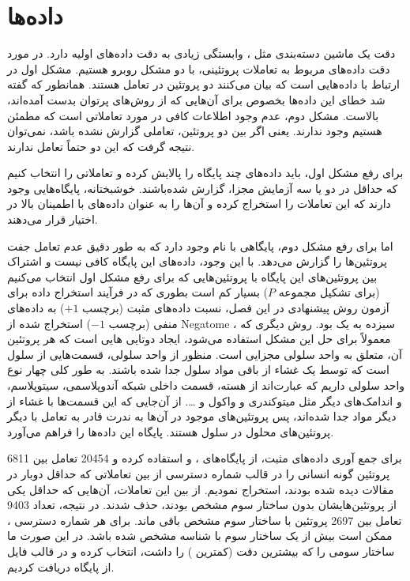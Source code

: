 \section{داده‌ها}
دقت یک ماشین دسته‌بندی مثل ، وابستگی زیادی به دقت داده‌های اولیه دارد. در مورد دقت داده‌های مربوط به تعاملات پروتئینی، با دو مشکل روبرو هستیم. مشکل اول در ارتباط با داده‌هایی است که بیان می‌کنند دو پروتئین در تعامل هستند. همانطور که گفته شد خطای این داده‌ها بخصوص برای آن‌هایی که از روش‌های پرتوان بدست آمده‌اند، بالاست. مشکل دوم، عدم وجود اطلاعات کافی در مورد تعاملاتی است که مطمئن هستیم وجود ندارند. یعنی اگر بین دو پروتئین، تعاملی گزارش نشده باشد، نمی‌توان نتیجه گرفت که این دو حتماً تعامل ندارند.

برای رفع مشکل اول، باید داده‌های چند پایگاه را پالایش کرده و تعاملاتی را انتخاب کنیم که حداقل در دو یا سه آزمایش مجزا، گزارش شده‌باشند. خوشبختانه، پایگاه‌هایی وجود دارند که این تعاملات را استخراج کرده و آن‌ها را به عنوان داده‌های با اطمینان بالا در اختیار قرار می‌دهند.

اما برای رفع مشکل دوم، پایگاهی با نام  وجود دارد که به طور دقیق عدم تعامل جفت پروتئین‌ها را گزارش می‌دهد. با این وجود، داده‌های این پایگاه کافی نیست و اشتراک بین پروتئین‌های این پایگاه با پروتئین‌هایی که برای رفع مشکل اول انتخاب می‌کنیم (برای تشکیل مجموعه $P$) بسیار کم است بطوری که در فرآیند استخراج داده برای آزمون روش پیشنهادی در این فصل، نسبت داده‌های مثبت (برچسب $+1$) به داده‌های منفی (برچسب $-1$) استخراج شده از Negatome ، سیزده به یک بود. روش دیگری که معمولاً برای حل این مشکل استفاده می‌شود، ایجاد دوتایی هایی است که هر پروتئین آن، متعلق به واحد سلولی مجزایی است. منظور از واحد سلولی، قسمت‌هایی از سلول است که توسط یک غشاء از باقی مواد سلول جدا شده باشند. به طور کلی چهار نوع واحد سلولی داریم که عبارت‌اند از هسته، قسمت داخلی شبکه آندوپلاسمی، سیتوپلاسم، و اندامک‌های دیگر مثل میتوکندری و واکول و \ldots . از آن‌جایی که این قسمت‌ها با غشاء از دیگر مواد جدا شده‌اند، پس پروتئین‌های موجود در آن‌ها به ندرت قادر به تعامل با دیگر پروتئین‌های محلول در سلول هستند. پایگاه  این داده‌ها را فراهم می‌آورد.

برای جمع آوری داده‌های مثبت، از پایگاه‌های ،  و  استفاده کرده و 20454 تعامل بین 6811 پروتئین گونه انسانی را در قالب شماره دسترسی  از بین تعاملاتی که حداقل دوبار در مقالات دیده شده بودند، استخراج نمودیم. از بین این تعاملات، آن‌هایی که حداقل یکی از پروتئین‌هایشان بدون ساختار سوم مشخص بودند، حذف شدند. در نتیجه، تعداد 9403 تعامل بین 2697 پروتئین با ساختار سوم مشخص باقی ماند. برای هر شماره دسترسی ، ممکن است بیش از یک ساختار سوم با شناسه  مشخص شده باشد. در این صورت ما ساختار سومی را که بیشترین دقت (کمترین ) را داشت، انتخاب کرده و در قالب فایل  از پایگاه  دریافت کردیم.

